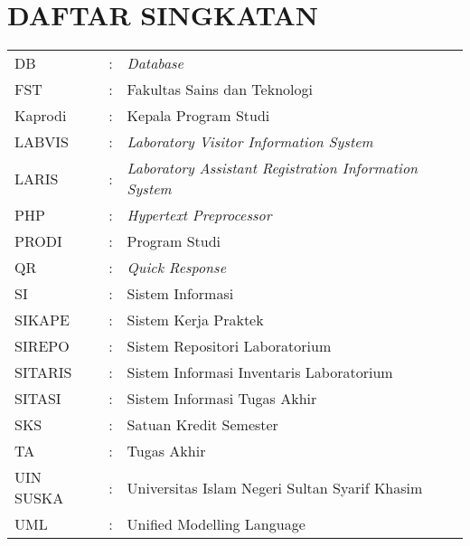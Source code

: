 %
%
%
%

\chapter*{DAFTAR SINGKATAN}
\begin{tabular}{lll}
	DB        & : & \textit{Database}                                             \\
	FST       & : & Fakultas Sains dan Teknologi                                  \\
	Kaprodi   & : & Kepala Program Studi                                          \\
	LABVIS    & : & \textit{Laboratory Visitor Information System}                \\
	LARIS     & : & \textit{Laboratory Assistant Registration Information System} \\
	PHP       & : & \textit{Hypertext Preprocessor}                               \\
	PRODI     & : & Program Studi                                                 \\
	QR        & : & \textit{Quick Response}                                       \\
	SI        & : & Sistem Informasi                                              \\
	SIKAPE    & : & Sistem Kerja Praktek                                          \\
	SIREPO    & : & Sistem Repositori Laboratorium                                \\
	SITARIS   & : & Sistem Informasi Inventaris Laboratorium                      \\
	SITASI    & : & Sistem Informasi Tugas Akhir                                  \\
	SKS       & : & Satuan Kredit Semester                                        \\
	TA        & : & Tugas Akhir                                                   \\
	UIN SUSKA & : & Universitas Islam Negeri Sultan Syarif Khasim                 \\
	UML       & : & Unified Modelling Language                                    \\
\end{tabular}